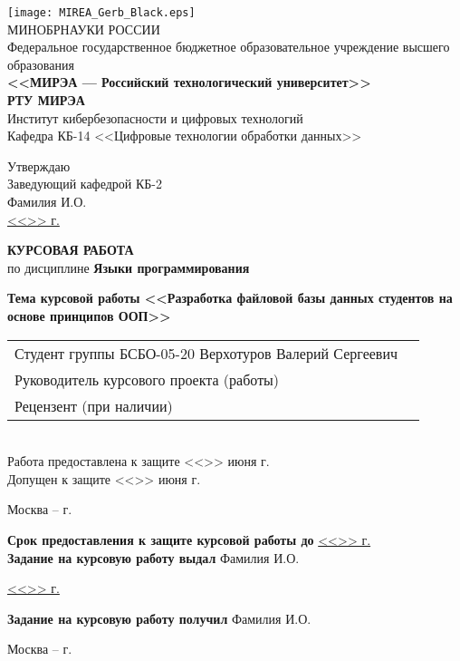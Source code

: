 \documentclass[14pt, a4paper, titlepage]{extarticle}
\begin{document}
\begin{titlepage}
    \begin{center}
        \texttt{[image: MIREA\_Gerb\_Black.eps]} \\
        МИНОБРНАУКИ РОССИИ \\ 
        Федеральное государственное бюджетное образовательное учреждение высшего образования \\
        \textbf{<<МИРЭА --- Российский технологический университет>>} \\
        \textbf{\fontsize{16pt}{16pt}\selectfont{}РТУ МИРЭА}\\
        Институт кибербезопасности и цифровых технологий \\
        Кафедра КБ-14 <<Цифровые технологии обработки данных>> \\
        \begin{flushright}
        Утверждаю \\
        Заведующий кафедрой КБ-2 \\
        Фамилия И.О.\quad\underline{\qquad\qquad}\\
        \underline{<<\qquad>>\qquad\qquad\the\year{} г.}
        \end{flushright}
        \fontsize{16pt}{16pt}\selectfont
        \textbf{КУРСОВАЯ РАБОТА} \\
        по дисциплине \textbf{Языки программирования}
    \end{center}
    \textbf{Тема курсовой работы <<Разработка файловой базы данных студентов на основе принципов ООП>>} \\
    \begin{tabular}{@{}lr}
        Студент группы БСБО-05-20 Верхотуров Валерий Сергеевич & \underline{\phantom{\qquad\qquad}} \\
        Руководитель курсового проекта (работы) \hrulefill & \hrulefill \\
        Рецензент (при наличии) \hrulefill & \hrulefill \\
    \end{tabular}\\
    \noindent{}Работа предоставлена к защите <<\underline{\qquad}>> июня \the\year{} г.\\
    \noindent{}Допущен к защите <<\underline{\qquad}>> июня \the\year{} г.\\
    \begin{center}
        \vfill{}Москва -- \the\year{} г.
    \end{center}
    \newpage
    \noindent\textbf{Срок предоставления к защите курсовой работы до} \underline{<<\qquad>>\qquad\quad\the\year{} г.}\\
    \textbf{Задание на курсовую работу выдал} Фамилия И.О. \hfill\underline{\qquad\qquad}
    \begin{flushright}
        \underline{<<\qquad>>\qquad\qquad\the\year{} г.}
    \end{flushright}
    \noindent\textbf{Задание на курсовую работу получил} Фамилия И.О. \hfill\underline{\qquad\qquad} \\
    \begin{center}
        \bigskip{}Москва -- \the\year{} г.
    \end{center}
    \thispagestyle{empty}
\end{titlepage}
\end{document}
